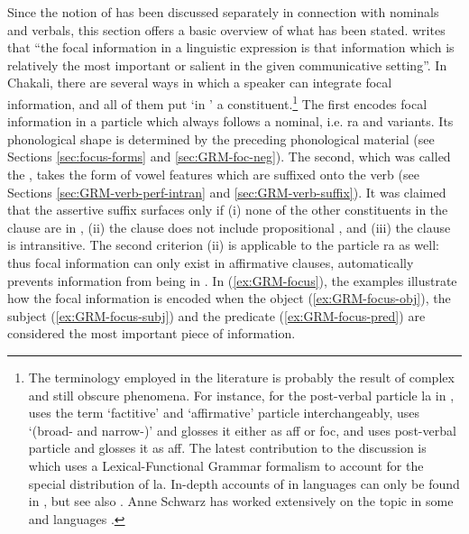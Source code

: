 \begin{exe}
\begin{exe}
\begin{exe}
\begin{exe}
\begin{exe}
\begin{exe}
\begin{exe}
\begin{exe}
\begin{exe}
\begin{exe}
\begin{exe}
\begin{exe}
Since the notion of  has been discussed separately in connection with nominals and verbals, this section offers a basic overview of what has been stated.  \citet[326]{Dik97} writes that   ``the focal information in a linguistic expression is that information which is relatively the most important or salient in the given communicative setting''.  In Chakali, there are  several ways in which a speaker can integrate focal information, and all of them put `in ' a constituent.\footnote{The  terminology employed in the literature is probably the result of  complex and still obscure phenomena. For instance, for the post-verbal particle {\sls la} in , \citet{Bodo97} uses the term `factitive' and  `affirmative' particle interchangeably, \citet{Daku05} uses `(broad- and narrow-)' and glosses it either as {\sc aff} or {\sc foc}, and \citet{Saan03} uses post-verbal particle and glosses it as {\sc aff}. The latest contribution  to the  discussion is  \citet{hiro14} which uses a Lexical-Functional Grammar formalism to account for the  special distribution of  {\sls la}. In-depth accounts of  in  languages can only be found in \citet{blas90}, but see also \citet{mcgi99}. Anne Schwarz has worked extensively on the topic in some  and  languages \citep{Schw10}.}   The first encodes focal information in a particle which  always follows a nominal, i.e. {\sls ra} and variants. Its  phonological shape is determined by the preceding phonological material (see Sections \ref{sec:focus-forms} and \ref{sec:GRM-foc-neg}). The second, which was called the , takes the form of vowel features which are suffixed onto the verb  (see Sections \ref{sec:GRM-verb-perf-intran} and \ref{sec:GRM-verb-suffix}). It was claimed that  the assertive suffix surfaces only if (i) none of the other constituents in the clause are in , (ii) the clause does not include propositional , and (iii) the clause is intransitive. The second criterion (ii) is applicable to the particle {\sls ra} as well: thus focal information can only exist in  affirmative clauses,  automatically prevents information from being in .  In (\ref{ex:GRM-focus}),  the examples illustrate  how the  focal information is encoded when the object (\ref{ex:GRM-focus-obj}), the subject (\ref{ex:GRM-focus-subj}) and the predicate  (\ref{ex:GRM-focus-pred}) are considered the most important piece of information. 
\ea\label{ex:GRM-focus}


\end{exe}
\end{exe}
\end{exe}
\end{exe}
\end{exe}
\end{exe}
\end{exe}
\end{exe}
\end{exe}
\end{exe}
\end{exe}
\end{exe}
